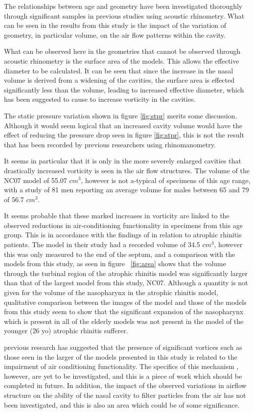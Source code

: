 
The relationships between age and geometry have been investigated thoroughly through significant samples in previous studies using acoustic rhinometry\cite{Kalmovich2005, WhanKim2007, Edelstein1996}. What can be seen in the results from this study is the impact of the variation of geometry, in particular volume, on the air flow patterns within the cavity. 

What can be observed here in the geometries that cannot be observed through acoustic rhinometry is the surface area of the models. This allows the effective diameter to be calculated.  It can be seen that since the increase in the nasal volume is derived from a widening of the cavities, the surface area is effected significantly less than the volume, leading to increased effective diameter, which has been suggested to cause to increase vorticity in the cavities\cite{Garcia2007}.

The static pressure variation shown in figure \ref{fig:stpr} merits some discussion. Although it would seem logical that an increased cavity volume would have the effect of reducing the pressure drop seen in figure \ref{fig:stpr}, this is not the result that has been recorded by previous researchers using rhinomanometry\cite{Lindemann2008}.

It seems in particular that it is only in the more severely enlarged cavities that drastically increased vorticity is seen in the air flow structures. The volume of the NC07 model of 55.07 $cm^3$, however is not a-typical of specimens of this age range, with a study of 81 men reporting an average volume for males between 65 and 79 of 56.7 $cm^3$\cite{Kalmovich2005}.

It seems probable that these marked increases in vorticity are linked to the observed reductions in air-conditioning functionality in specimens from this age group\cite{Lindemann2009a}. This is in accordance with the findings of\cite{Garcia2007} in relation to atrophic rhinitis patients. The model in their study had a recorded volume of 34.5 $cm^3$, however this was only measured to the end of the septum, and a comparison with the models from this study, as seen in figure ~\ref{fig:area} shows that the volume through the turbinal region of the atrophic rhinitis model was significantly larger than that of the largest model from this study, NC07. Although a quantity is not given for the volume of the nasopharynx in the atrophic rhinitis model, qualitative comparison between the  images of the model and those of the models from this study seem to show that the significant expansion of the nasopharynx which is present in all of the elderly models was not present in the model of the younger (26 yo) atrophic rhinitis sufferer. 

previous research has suggested that the presence of significant vortices such as those seen in the larger of the models presented in this study is related to the impairment of air conditioning functionality. The specifics of this mechanism , however, are yet to be investigated, and this is a piece of work which should be completed in future. In addition, the impact of the observed variations in airflow structure on the ability of the nasal cavity to filter particles from the air has not been investigated, and this is also an area which could be of some significance.
